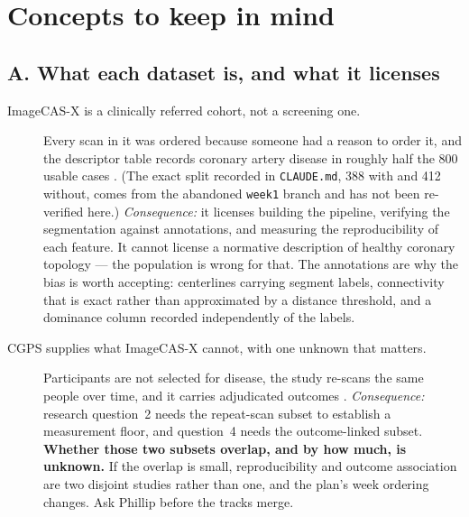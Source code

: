 %
%
%
%

\section*{Concepts to keep in mind}

\subsection*{A. What each dataset is, and what it licenses}

\begin{description}

\item[ImageCAS-X is a clinically referred cohort, not a screening one.]
Every scan in it was ordered because someone had a reason to order it, and the descriptor table
records coronary artery disease in roughly half the 800 usable cases
\cite{bransby2026imagecasx,zeng2023imagecas}.
(The exact split recorded in \texttt{CLAUDE.md}, 388 with and 412 without, comes from the abandoned
\texttt{week1} branch and has not been re-verified here.)
\textit{Consequence:} it licenses building the pipeline, verifying the segmentation against
annotations, and measuring the reproducibility of each feature. It cannot license a
normative description of healthy coronary topology --- the population is wrong for that. The
annotations are why the bias is worth accepting: centerlines carrying segment labels, connectivity
that is exact rather than approximated by a distance threshold, and a dominance column recorded independently of the labels.

\item[CGPS supplies what ImageCAS-X cannot, with one unknown that matters.]
Participants are not selected for disease, the study re-scans the same people over time, and it
carries adjudicated outcomes \cite{fuchs2023cgps}.
\textit{Consequence:} research question~2 needs the repeat-scan subset to establish a measurement
floor, and question~4 needs the outcome-linked subset. \textbf{Whether those two subsets overlap,
and by how much, is unknown.} If the overlap is small, reproducibility and outcome association are
two disjoint studies rather than one, and the plan's week ordering changes. Ask Phillip before the
tracks merge.

\end{description}

